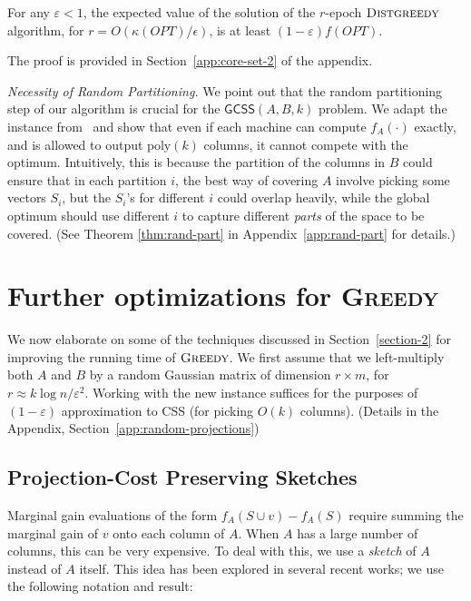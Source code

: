 \documentclass{article}
\newcommand{\eps}{\varepsilon}
\newcommand{\greedy}{\textsc{Greedy}}
\newcommand{\distgreedy}{\textsc{Distgreedy}}
\newcommand{\opt}{OPT}
\newcommand{\gcss}{\textsf{GCSS}}
\begin{document}
\begin{thm}\label{thm:core-set-2}
For any $\eps <1$, the expected value of the solution of the $r$-epoch $\distgreedy$ algorithm, for $r = O(\kappa(\opt)/\epsilon)$, is at least $(1-\eps)f(OPT)$.
\end{thm}

The proof is provided in Section~\ref{app:core-set-2} of the appendix.

{\em Necessity of Random Partitioning.}  We point out that the random partitioning step of our algorithm is crucial for the $\gcss(A, B, k)$ problem.  We adapt the instance from~\cite{VahabPODS2014} and show that even if each machine can compute $f_A(\cdot)$ exactly, and is allowed to output $\text{poly}(k)$ columns, it cannot compete with the optimum. Intuitively, this is because the partition of the columns in $B$ could ensure that in each partition $i$, the best way of covering $A$ involve picking some vectors $S_i$, but the $S_i$'s for different $i$ could overlap heavily, while the global optimum should use different $i$ to capture different {\em parts} of the space to be covered. (See Theorem \ref{thm:rand-part} in Appendix~\ref{app:rand-part} for details.)


\section{Further optimizations for \greedy} \label{section-5}
We now elaborate on some of the techniques discussed in Section~\ref{section-2} for improving the running time of $\greedy$. 
We first assume that we left-multiply both $A$ and $B$ by a random Gaussian matrix of dimension $r \times m$, for $r \approx k \log n/\eps^2$. Working with the new instance suffices for the purposes of $(1-\eps)$ approximation to CSS (for picking $O(k)$ columns). (Details in the Appendix, Section~\ref{app:random-projections})









\subsection{Projection-Cost Preserving Sketches}
Marginal gain evaluations of the form $f_A(S \cup v) - f_A(S)$ require summing the marginal gain of $v$ onto each column of $A$. When $A$ has a large number of columns, this can be very expensive. To deal with this, we use a {\em sketch} of $A$ instead of $A$ itself. This idea has been explored in several recent works; we use the following notation and result: 
\end{document}
